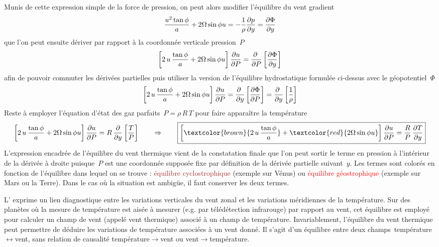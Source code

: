 \sk
Munis de cette expression simple de la force de pression, on peut alors modifier l'équilibre du vent gradient
\[ \dfrac{u^2\tan\phi}{a} + 2\Omega\sin\phi u = -\dfrac{1}{\rho}\dfrac{\partial p }{\partial y} = \frac{\partial \Phi}{\partial y} \]
\noindent que l'on peut ensuite dériver par rapport à la coordonnée verticale pression~$P$ 
\[ \left[ 2 \, u \, \dfrac{\tan\phi}{a} + 2\Omega\sin\phi u \right] \dfrac{\partial u }{\partial P} = \dfrac{\partial ~ }{\partial P} \left[ \frac{\partial \Phi}{\partial y} \right] \]
\noindent afin de pouvoir commuter les dérivées partielles puis utiliser la version de l'équilibre hydrostatique formulée ci-dessus avec le géopotentiel~$\Phi$
\[ \left[ 2 \, u \, \dfrac{\tan\phi}{a} + 2\Omega\sin\phi u \right] \dfrac{\partial u }{\partial P} = \dfrac{\partial ~ }{\partial y} \left[ \frac{\partial \Phi}{\partial P} \right] = \dfrac{\partial ~ }{\partial y} \left[ \frac{1}{\rho} \right] \]
\noindent Reste à employer l'équation d'état des gaz parfaits~$P=\rho\,R\,T$ pour faire apparaître la température
\[ \left[ 2 \, u \, \dfrac{\tan\phi}{a} + \fcoriolis u \right] \der{u}{P} = R \, \frac{\partial}{\partial y} \left[ \frac{T}{P} \right] 
\qquad \Rightarrow \qquad
\boxed{ \left[ \textcolor{brown}{2\,u\,\frac{\tan\phi}{a}} + \textcolor{red}{\fcoriolis u} \right] \der{u}{P} = \frac{R}{P} \, \frac{\partial T}{\partial y} }
\]
\noindent L'expression encadrée de l'équilibre du vent thermique vient de la constatation finale que l'on peut sortir le terme en pression à l'intérieur de la dérivée à droite puisque~$P$ est une coordonnée supposée fixe par définition de la dérivée partielle suivant~$y$. Les termes sont colorés en fonction de l'équilibre dans lequel on se trouve : \textcolor{brown}{équilibre cyclostrophique} (exemple sur Vénus) ou \textcolor{red}{équilibre géostrophique} (exemple sur Mars ou la Terre). Dans le cas où la situation est ambigüe, il faut conserver les deux termes.

\sk
L' exprime un lien diagnostique entre les variations verticales du vent zonal et les variations méridiennes de la température. Sur des planètes où la mesure de température est aisée à mesurer (e.g. par télédétection infrarouge) par rapport au vent, cet équilibre est employé pour calculer un champ de vent (appelé vent thermique) associé à un champ de température. Invariablement, l'équilibre du vent thermique peut permettre de déduire les variations de température associées à un vent donné. Il s'agit d'un équilibre entre deux champs~température$\leftrightarrow$vent, sans relation de causalité température$\rightarrow$vent ou vent$\rightarrow$température.


